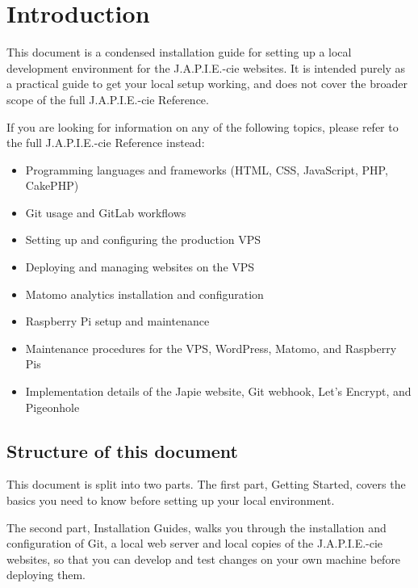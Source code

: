 \chapter{Introduction} \label{chap:introduction}

This document is a condensed installation guide for setting up a local development environment for the J.A.P.I.E.-cie websites. It is intended purely as a practical guide to get your local setup working, and does not cover the broader scope of the full J.A.P.I.E.-cie Reference.

If you are looking for information on any of the following topics, please refer to the full J.A.P.I.E.-cie Reference instead:
\begin{itemize}
    \item Programming languages and frameworks (HTML, CSS, JavaScript, PHP, CakePHP)
    \item Git usage and GitLab workflows
    \item Setting up and configuring the production VPS
    \item Deploying and managing websites on the VPS
    \item Matomo analytics installation and configuration
    \item Raspberry Pi setup and maintenance
    \item Maintenance procedures for the VPS, WordPress, Matomo, and Raspberry Pis
    \item Implementation details of the Japie website, Git webhook, Let's Encrypt, and Pigeonhole
\end{itemize}

\section{Structure of this document}

This document is split into two parts. The first part, Getting Started, covers the basics you need to know before setting up your local environment.

The second part, Installation Guides, walks you through the installation and configuration of Git, a local web server and local copies of the J.A.P.I.E.-cie websites, so that you can develop and test changes on your own machine before deploying them.

\clearpage
